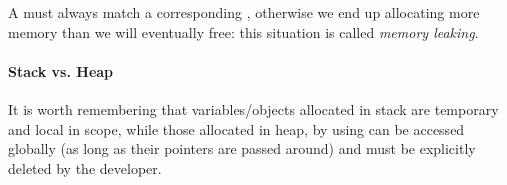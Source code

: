 A  must always match a corresponding , otherwise we end up allocating more memory than we will eventually free: this situation is called \emph{memory leaking}.

\paragraph{Stack vs. Heap}
It is worth remembering that variables/objects allocated in stack are temporary and local in scope, while those allocated in heap, by using  can be accessed globally (as long as their pointers are passed around) and must be explicitly deleted by the developer.

